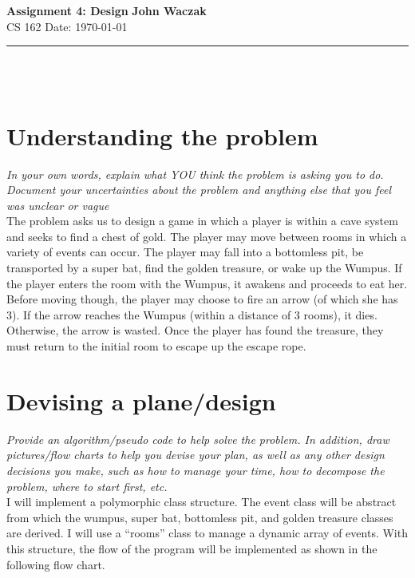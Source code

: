 \documentclass[a4paper, 11pt]{article}
\begin{document}
\noindent
\large\textbf{Assignment 4: Design} \hfill \textbf{John Waczak} \\
\normalsize CS 162 \hfill  Date: \today 
\par\noindent\rule{\textwidth}{0.4pt} \\\\



\section*{Understanding the problem}

\textit{In your own words, explain what YOU think the problem is asking you to
  do.  Document your uncertainties about the problem and anything else that you
  feel was unclear or vague}\\

The problem asks us to design a game in which a player is within a cave system
and seeks to find a chest of gold. The player may move between rooms in which a
variety of events can occur. The player may fall into a bottomless pit, be
transported by a super bat, find the golden treasure, or wake up the Wumpus. If
the player enters the room with the Wumpus,  it awakens and proceeds to eat her.
Before moving though, the player may choose to fire an arrow (of which she has
3). If the arrow reaches the Wumpus (within a distance of 3 rooms), it dies.
Otherwise, the arrow is wasted. Once the player has found the treasure, they
must return to the initial room to escape up the escape rope. 
\section*{Devising a plane/design}

\textit{Provide an algorithm/pseudo code to help solve the problem. In addition,
  draw pictures/flow charts to help you devise your plan, as well as any other
  design decisions you make, such as how to manage your time, how to decompose
  the problem, where to start first, etc. }\\ 

I will implement a polymorphic class structure. The event class will be abstract
from which the wumpus, super bat, bottomless pit, and golden treasure classes
are derived. I will use a ``rooms'' class to manage a dynamic array of events.
With this structure, the flow of the program will be implemented as shown in the
following flow chart.


\end{document}
